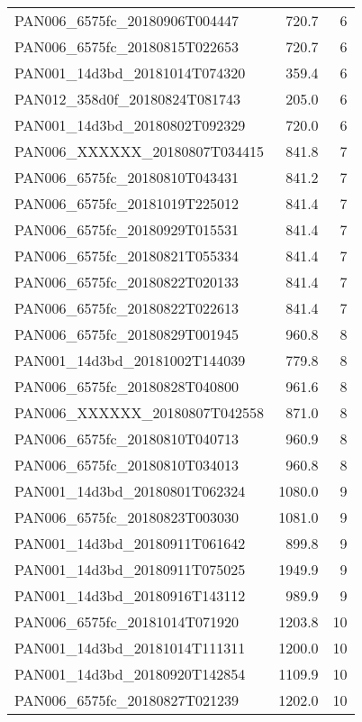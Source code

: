 \begin{tabular}{lrr}
PAN006\_6575fc\_20180906T004447 &      720.7 &        6 \\
PAN006\_6575fc\_20180815T022653 &      720.7 &        6 \\
PAN001\_14d3bd\_20181014T074320 &      359.4 &        6 \\
PAN012\_358d0f\_20180824T081743 &      205.0 &        6 \\
PAN001\_14d3bd\_20180802T092329 &      720.0 &        6 \\
PAN006\_XXXXXX\_20180807T034415 &      841.8 &        7 \\
PAN006\_6575fc\_20180810T043431 &      841.2 &        7 \\
PAN006\_6575fc\_20181019T225012 &      841.4 &        7 \\
PAN006\_6575fc\_20180929T015531 &      841.4 &        7 \\
PAN006\_6575fc\_20180821T055334 &      841.4 &        7 \\
PAN006\_6575fc\_20180822T020133 &      841.4 &        7 \\
PAN006\_6575fc\_20180822T022613 &      841.4 &        7 \\
PAN006\_6575fc\_20180829T001945 &      960.8 &        8 \\
PAN001\_14d3bd\_20181002T144039 &      779.8 &        8 \\
PAN006\_6575fc\_20180828T040800 &      961.6 &        8 \\
PAN006\_XXXXXX\_20180807T042558 &      871.0 &        8 \\
PAN006\_6575fc\_20180810T040713 &      960.9 &        8 \\
PAN006\_6575fc\_20180810T034013 &      960.8 &        8 \\
PAN001\_14d3bd\_20180801T062324 &     1080.0 &        9 \\
PAN006\_6575fc\_20180823T003030 &     1081.0 &        9 \\
PAN001\_14d3bd\_20180911T061642 &      899.8 &        9 \\
PAN001\_14d3bd\_20180911T075025 &     1949.9 &        9 \\
PAN001\_14d3bd\_20180916T143112 &      989.9 &        9 \\
PAN006\_6575fc\_20181014T071920 &     1203.8 &       10 \\
PAN001\_14d3bd\_20181014T111311 &     1200.0 &       10 \\
PAN001\_14d3bd\_20180920T142854 &     1109.9 &       10 \\
PAN006\_6575fc\_20180827T021239 &     1202.0 &       10 \\

\end{tabular}

